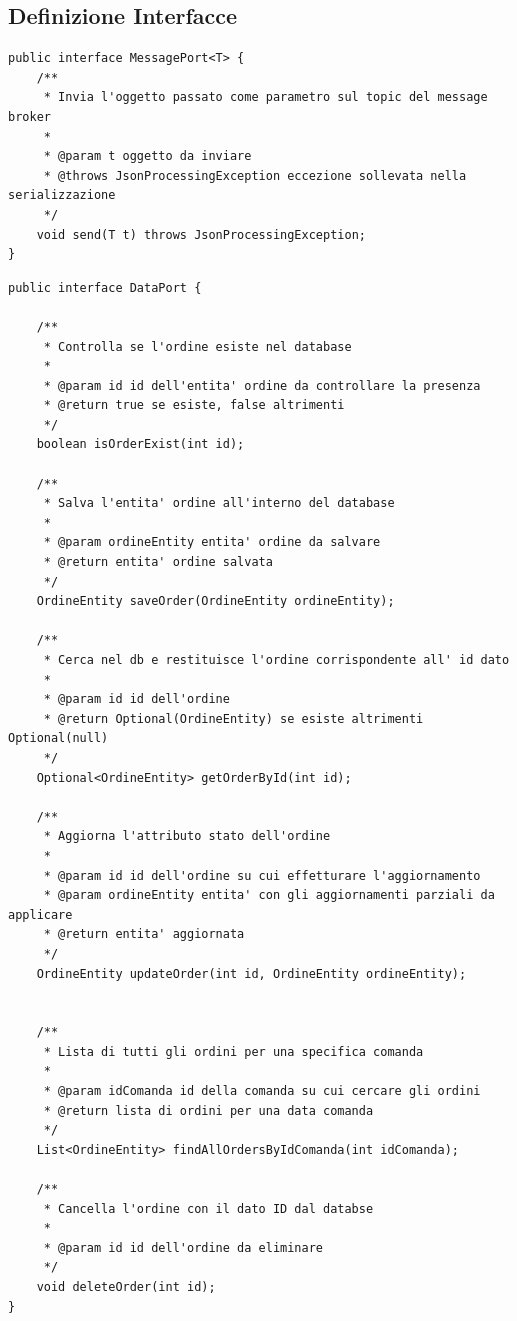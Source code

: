 \subsection{Definizione Interfacce}
\begin{lstlisting}[style=myJava, 
    caption={Interfaccia MessagePort}, label=lst:messageport, emph={[3] send},
    emphstyle={[3]\color{codeCyan}}]
public interface MessagePort<T> {
    /**
     * Invia l'oggetto passato come parametro sul topic del message broker
     *
     * @param t oggetto da inviare
     * @throws JsonProcessingException eccezione sollevata nella serializzazione
     */
    void send(T t) throws JsonProcessingException;
}
\end{lstlisting}

\begin{lstlisting}[style=myJava, 
    caption={Interfaccia DataPort}, label=lst:dataport,
    emph={[3] isOrderExist, saveOrder, getOrderById, updateOrder, findAllOrdersByIdComanda, deleteOrder},
    emphstyle={[3]\color{codeCyan}}]
public interface DataPort {

    /**
     * Controlla se l'ordine esiste nel database
     *
     * @param id id dell'entita' ordine da controllare la presenza
     * @return true se esiste, false altrimenti
     */
    boolean isOrderExist(int id);

    /**
     * Salva l'entita' ordine all'interno del database
     *
     * @param ordineEntity entita' ordine da salvare
     * @return entita' ordine salvata
     */
    OrdineEntity saveOrder(OrdineEntity ordineEntity);

    /**
     * Cerca nel db e restituisce l'ordine corrispondente all' id dato
     *
     * @param id id dell'ordine
     * @return Optional(OrdineEntity) se esiste altrimenti Optional(null)
     */
    Optional<OrdineEntity> getOrderById(int id);

    /**
     * Aggiorna l'attributo stato dell'ordine
     *
     * @param id id dell'ordine su cui effetturare l'aggiornamento
     * @param ordineEntity entita' con gli aggiornamenti parziali da applicare
     * @return entita' aggiornata
     */
    OrdineEntity updateOrder(int id, OrdineEntity ordineEntity);


    /**
     * Lista di tutti gli ordini per una specifica comanda
     *
     * @param idComanda id della comanda su cui cercare gli ordini
     * @return lista di ordini per una data comanda
     */
    List<OrdineEntity> findAllOrdersByIdComanda(int idComanda);

    /**
     * Cancella l'ordine con il dato ID dal databse
     *
     * @param id id dell'ordine da eliminare
     */
    void deleteOrder(int id);
}
\end{lstlisting}

